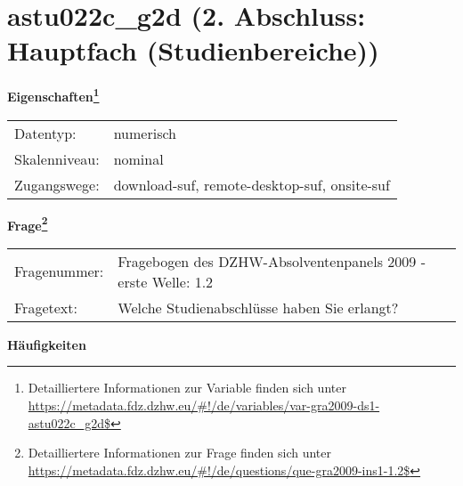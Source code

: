 
    \setcounter{footnote}{0}

    \vspace*{-1.8cm}
	\section{astu022c\_g2d (2. Abschluss: Hauptfach (Studienbereiche))}
	\label{section:astu022c_g2d}



    \vspace*{0.5cm}
    \noindent\textbf{Eigenschaften\footnote{Detailliertere Informationen zur Variable finden sich unter
		\url{https://metadata.fdz.dzhw.eu/\#!/de/variables/var-gra2009-ds1-astu022c_g2d$}}}\\
	\begin{tabularx}{\hsize}{@{}lX}
	Datentyp: & numerisch \\
	Skalenniveau: & nominal \\
	Zugangswege: &
	  download-suf, 
	  remote-desktop-suf, 
	  onsite-suf
 \\
    \end{tabularx}



				\vspace*{0.5cm}
                \noindent\textbf{Frage\footnote{Detailliertere Informationen zur Frage finden sich unter
		              \url{https://metadata.fdz.dzhw.eu/\#!/de/questions/que-gra2009-ins1-1.2$}}}\\
				\begin{tabularx}{\hsize}{@{}lX}
					Fragenummer: &
					  Fragebogen des DZHW-Absolventenpanels 2009 - erste Welle:
					  1.2
 \\
					Fragetext: & Welche Studienabschlüsse haben Sie erlangt? \\
				\end{tabularx}





        		\vspace*{0.5cm}
                \noindent\textbf{Häufigkeiten}

